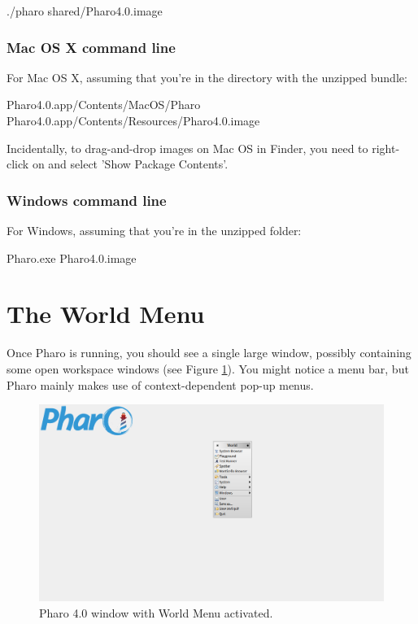 \documentclass[a4paper,10pt,twoside]{book}
\begin{document}
\begin{code}{}
./pharo shared/Pharo4.0.image
\end{code}

\subsubsection{Mac OS X command line}
For Mac OS X, assuming that you're in the directory with the unzipped
 bundle:


\begin{code}{}
Pharo4.0.app/Contents/MacOS/Pharo Pharo4.0.app/Contents/Resources/Pharo4.0.image
\end{code}


Incidentally, to drag-and-drop images on Mac OS in Finder, you need to
right-click on  and select 'Show Package Contents'.
\subsubsection{Windows command line}
For Windows, assuming that you're in the unzipped  folder:


\begin{code}{}
Pharo.exe Pharo4.0.image
\end{code}

\section{The World Menu}
Once Pharo is running, you should see a single large window, possibly containing
some open workspace windows (see Figure \ref{worldMenu}). You might notice a menu
bar, but Pharo mainly makes use of context-dependent pop-up menus.


\begin{figure}

\begin{center}
\includegraphics[width=1.0\textwidth]{figures/Pharo40.png}\caption{Pharo 4.0 window with World Menu activated.\label{worldMenu}}\end{center}
\end{figure}
\end{document}
